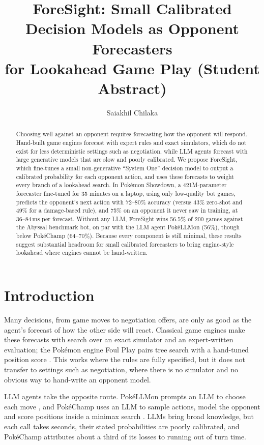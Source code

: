 \documentclass[letterpaper]{article} %
\title{ForeSight: Small Calibrated Decision Models as Opponent Forecasters\\for Lookahead Game Play (Student Abstract)}
\author{
    Saiakhil Chilaka
}
\begin{document}
\maketitle

\begin{abstract}
Choosing well against an opponent requires forecasting how the opponent will respond. Hand-built game engines forecast with expert rules and exact simulators, which do not exist for less deterministic settings such as negotiation, while LLM agents forecast with large generative models that are slow and poorly calibrated. We propose ForeSight, which fine-tunes a small non-generative ``System One'' decision model to output a calibrated probability for each opponent action, and uses these forecasts to weight every branch of a lookahead search. In Pok\'emon Showdown, a 421M-parameter forecaster fine-tuned for 35 minutes on a laptop, using only low-quality bot games, predicts the opponent's next action with 72--80\% accuracy (versus 43\% zero-shot and 49\% for a damage-based rule), and 75\% on an opponent it never saw in training, at 36--84\,ms per forecast. Without any LLM, ForeSight wins 56.5\% of 200 games against the Abyssal benchmark bot, on par with the LLM agent PokéLLMon (56\%), though below PokéChamp (64--70\%). Because every component is still minimal, these results suggest substantial headroom for small calibrated forecasters to bring engine-style lookahead where engines cannot be hand-written.
\end{abstract}


\section{Introduction}
Many decisions, from game moves to negotiation offers, are only as good as the agent's forecast of how the other side will react. Classical game engines make these forecasts with search over an exact simulator and an expert-written evaluation; the Pok\'emon engine Foul Play pairs tree search with a hand-tuned position score \citep{foulplay}. This works where the rules are fully specified, but it does not transfer to settings such as negotiation, where there is no simulator and no obvious way to hand-write an opponent model.

LLM agents take the opposite route. PokéLLMon prompts an LLM to choose each move \citep{pokellmon}, and PokéChamp uses an LLM to sample actions, model the opponent and score positions inside a minimax search \citep{pokechamp}. LLMs bring broad knowledge, but each call takes seconds, their stated probabilities are poorly calibrated, and PokéChamp attributes about a third of its losses to running out of turn time.
\end{document}
